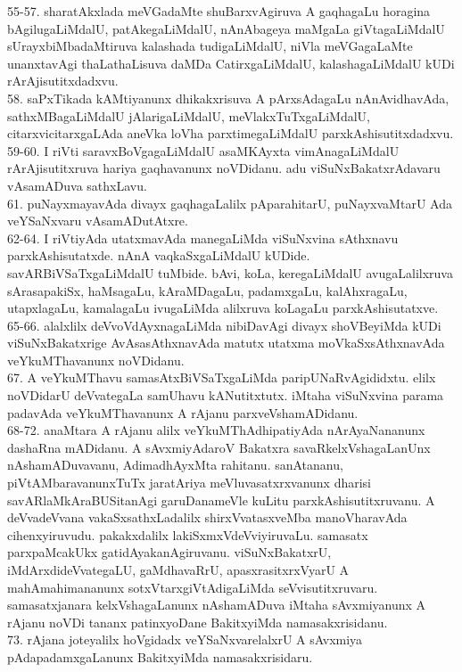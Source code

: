 \documentclass{article}
\begin{document}
55-57. sharatAkxlada meVGadaMte shuBarxvAgiruva A gaqhagaLu horagina bAgilugaLiMdalU, patAkegaLiMdalU, nAnAbageya maMgaLa giVtagaLiMdalU sUrayxbiMbadaMtiruva kalashada tudigaLiMdalU, niVla meVGagaLaMte unanxtavAgi thaLathaLisuva daMDa CatirxgaLiMdalU, kalashagaLiMdalU kUDi rArAjisutitxdadxvu.\\
58. saPxTikada kAMtiyanunx dhikakxrisuva A pArxsAdagaLu nAnAvidhavAda, sathxMBagaLiMdalU jAlarigaLiMdalU, meVlakxTuTxgaLiMdalU, citarxvicitarxgaLAda aneVka loVha parxtimegaLiMdalU parxkAshisutitxdadxvu.\\
59-60. I riVti saravxBoVgagaLiMdalU asaMKAyxta vimAnagaLiMdalU rArAjisutitxruva hariya gaqhavanunx noVDidanu. adu viSuNxBakatxrAdavaru vAsamADuva sathxLavu.\\
61. puNayxmayavAda divayx gaqhagaLalilx pAparahitarU, puNayxvaMtarU Ada veYSaNxvaru vAsamADutAtxre.\\
62-64. I riVtiyAda utatxmavAda manegaLiMda viSuNxvina sAthxnavu parxkAshisutatxde. nAnA vaqkaSxgaLiMdalU kUDide. savARBiVSaTxgaLiMdalU tuMbide. bAvi, koLa, keregaLiMdalU avugaLalilxruva sArasapakiSx, haMsagaLu, kAraMDagaLu, padamxgaLu, kalAhxragaLu, utapxlagaLu, kamalagaLu ivugaLiMda alilxruva koLagaLu parxkAshisutatxve.\\
65-66. alalxlilx deVvoVdAyxnagaLiMda nibiDavAgi divayx shoVBeyiMda kUDi viSuNxBakatxrige AvAsasAthxnavAda matutx utatxma moVkaSxsAthxnavAda veYkuMThavanunx noVDidanu.\\
67. A veYkuMThavu samasAtxBiVSaTxgaLiMda paripUNaRvAgididxtu. elilx noVDidarU deVvategaLa samUhavu kANutitxtutx. iMtaha viSuNxvina parama padavAda veYkuMThavanunx A rAjanu parxveVshamADidanu.\\
68-72. anaMtara A rAjanu alilx veYkuMThAdhipatiyAda nArAyaNananunx dashaRna mADidanu. A sAvxmiyAdaroV Bakatxra savaRkelxVshagaLanUnx nAshamADuvavanu, AdimadhAyxMta rahitanu. sanAtananu, piVtAMbaravanunxTuTx jaratAriya meVluvasatxrxvanunx dharisi savARlaMkAraBUSitanAgi garuDanameVle kuLitu parxkAshisutitxruvanu. A deVvadeVvana vakaSxsathxLadalilx shirxVvatasxveMba manoVharavAda cihenxyiruvudu. pakakxdalilx lakiSxmxVdeVviyiruvaLu. samasatx parxpaMcakUkx gatidAyakanAgiruvanu. viSuNxBakatxrU, iMdArxdideVvategaLU, gaMdhavaRrU, apasxrasitxrxVyarU A mahAmahimananunx sotxVtarxgiVtAdigaLiMda seVvisutitxruvaru. samasatxjanara kelxVshagaLanunx nAshamADuva iMtaha sAvxmiyanunx A rAjanu noVDi tananx patinxyoDane BakitxyiMda namasakxrisidanu.\\
73. rAjana joteyalilx hoVgidadx veYSaNxvarelalxrU A sAvxmiya pAdapadamxgaLanunx BakitxyiMda namasakxrisidaru.\\
\end{document}
